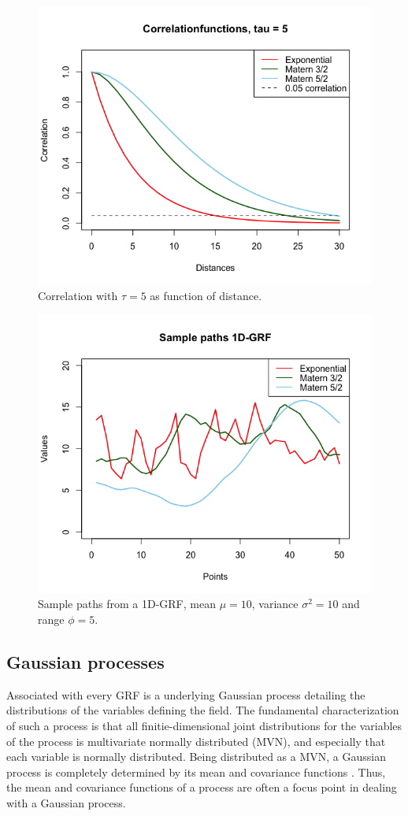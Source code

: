 \begin{figure}[p]
     \centering
     \includegraphics[width=0.8\linewidth]{figurer/correlation_tau5.png}
     \caption{Correlation with $\tau = 5$ as function of distance.}
     \label{fig:correlation_tau5}
\end{figure}
\begin{figure}[p]	
     \centering
     \includegraphics[width=0.8\linewidth]{figurer/sample_paths_1d.png}
	 \caption{Sample paths from a 1D-GRF, mean $\mu = 10$, variance $\sigma^2 = 10$ and range $\phi = 5$.}
	 \label{fig:sample_path_simple}
\end{figure}

\subsection{Gaussian processes} \label{sec:gaussian_processes}
Associated with every GRF is a underlying Gaussian process detailing the distributions of the variables defining the field. The fundamental characterization of such a process is that all finitie-dimensional joint distributions for the variables of the process is multivariate normally distributed (MVN), and especially that each variable is normally distributed. Being distributed as a MVN, a Gaussian process is completely determined by its mean and covariance functions \cite{RasmussenEtAl}. Thus, the mean and covariance functions of a process are often a focus point in dealing with a Gaussian process. 

